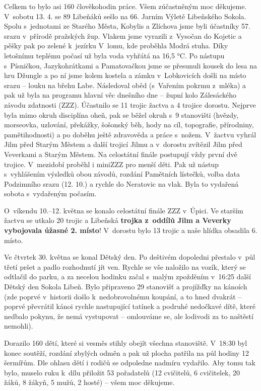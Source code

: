 \documentclass[11pt]{article}
\begin{document}
Celkem to bylo asi 160 člověkohodin práce. Všem zúčastněným moc děkujeme. 
\clearpage
\vspace*{-36pt}
V~sobotu 13. 4. se 89 Libeňáků sešlo na 66. Jarním Výletě Libeňského Sokola. Spolu s~jednotami ze Starého Města, Kobylis a Zlíchova jsme byli účastníky 57. srazu v~přírodě pražských žup. Vlakem jsme vyrazili z~Vysočan do Kojetic a pěšky pak po zelené k~jezírku V~lomu, kde proběhla Modrá stuha. Díky letošnímu teplému počasí už byla voda vyhřátá na 16,5 °C. Po nástupu s~Písničkou, Jazykohrátkami a Pamatovačkou jsme se přesunuli kousek do lesa na hru Džungle a po ní jsme kolem kostela a zámku v~Lobkovicích došli na místo srazu – louku na břehu Labe. Následoval oběd (s~Vařením pokrmu z~mléka) a pak už byla na programu hlavní věc dnešního dne – župní kolo Zálesáckého závodu zdatnosti (ZZZ). Účastnilo se 11 trojic žactva a 4 trojice dorostu. Nejprve byla mimo okruh disciplína oheň, pak se běžel okruh s~9 stanovišti (hvězdy, morseovka, uzlování, překážky, šošonský běh, hody na cíl, topografie, přírodniny, pamětihodnosti) a po doběhu ještě zdravověda a práce s~nožem. V~žactvu vyhrál Jilm před Starým Městem a další trojicí Jilmu a v~dorostu zvítězil Jilm před Veverkami a Starým Městem. Na celostátní finále postupují vždy první dvě trojice. V~mezidobí proběhl i miniZZZ pro menší děti. Pak už nástup s~vyhlášením výsledků obou závodů, rozdání Pamětních lístečků, volba data Podzimního srazu (12. 10.) a rychle do Neratovic na vlak. Byla to vydařená sobota s~vydařeným počasím.

O~víkendu 10.–12. května se konalo celostátní finále ZZZ v~Úpici. Ve starším žactvu se utkalo 20 trojic a Libeňská \textbf{trojka z~oddílů Jilm a Veverky vybojovala úžasné 2. místo}! V~dorostu bylo 13 trojic a naše hlídka obsadila 6. místo.

Ve čtvrtek 30. května se konal Dětský den. Po deštivém dopoledni přestalo v~půl třetí pršet a padlo rozhodnutí jít ven. Rychle se vše naložilo na vozík, který se odtlačil do parku, a za necelou hodinku začal s~malým zpožděním v~16:25 další Dětský den Sokola Libeň. Bylo připraveno 29 stanovišť a projížďky na kánoích (zde poprvé v~historii došlo k~nedobrovolnému koupání, a to hned dvakrát – poprvé převrátil kánoi rychle nastupující tatínek a podruhé nedočkavé dítě, které nedbalo pokynu, že nemá vystupovat – omlouváme se, ale lodivodi za to naštěstí nemohli).

Dorazilo 160 dětí, které si vesměs stihly obejít všechna stanoviště. V~18:30 byl konec soutěží, rozdání zbylých odměn a pak už plocha patřila na půl hodiny 12 šermířům. Dle ohlasu dětí i rodičů se odpoledne nadmíru vydařilo. Aby tomu tak bylo, muselo ruku k~dílu přiložit 53 pořadatelů (12 cvičitelů, 6 cvičitelek, 20 žáků, 8 žákyň, 5 mužů, 2 hosté) – všem moc děkujeme. 
\end{document}

